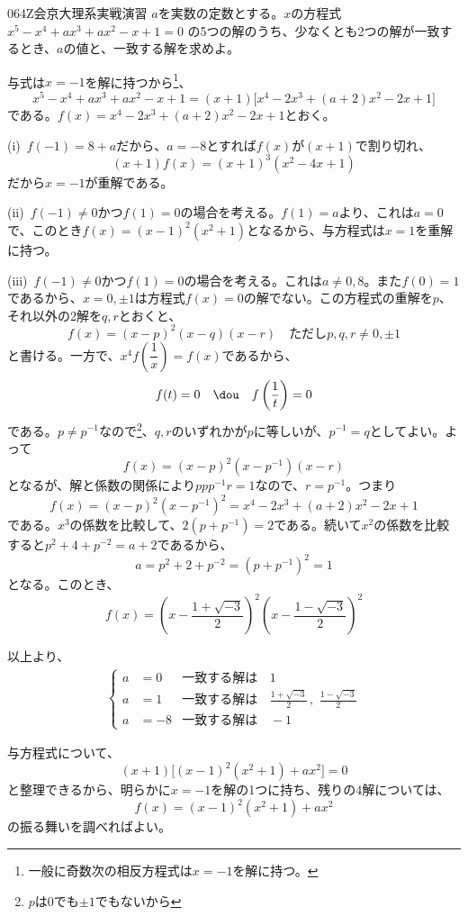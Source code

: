 \begin{prob}{064}{}{Z会京大理系実戦演習}
 $a$を実数の定数とする。$x$の方程式 $x^5-x^4+ax^3+ax^2-x+1=0$ の5つの解のうち、少なくとも2つの解が一致するとき、$a$の値と、一致する解を求めよ。
\end{prob}

与式は$x=-1$を解に持つから\footnote{一般に奇数次の相反方程式は$x=-1$を解に持つ。}、
\[ x^5-x^4+ax^3+ax^2-x+1=(x+1)\bigl[x^4-2x^3+(a+2)x^2-2x+1\bigr] \]
である。$f(x)=x^4-2x^3+(a+2)x^2-2x+1$とおく。

(i)~$f(-1)=8+a$だから、$a=-8$とすれば$f(x)$が$(x+1)$で割り切れ、
\[ (x+1)f(x)=(x+1)^3(x^2-4x+1) \]
だから$x=-1$が重解である。

(ii)~$f(-1)\neq 0$かつ$f(1)=0$の場合を考える。$f(1)=a$より、これは$a=0$で、このとき$f(x)=(x-1)^2(x^2+1)$となるから、与方程式は$x=1$を重解に持つ。

(iii)~$f(-1)\neq 0$かつ$f(1)=0$の場合を考える。これは$a\neq 0, 8$。また$f(0)=1$であるから、$x=0, \pm 1$は方程式$f(x)=0$の解でない。この方程式の重解を$p$、それ以外の2解を$q, r$とおくと、
\[ f(x)=(x-p)^2(x-q)(x-r) \quad \text{ただし$p, q, r\neq 0, \pm 1$} \]
と書ける。一方で、$x^4f\left(\dfrac{1}{x}\right)=f(x)$であるから、
\[ f(t)=0 \quad\dou\quad f\left(\frac{1}{t}\right)=0 \]
である。$p\neq p^{-1}$なので\footnote{$p$は$0$でも$\pm 1$でもないから}、$q, r$のいずれかが$p$に等しいが、$p^{-1}=q$としてよい。よって
\[ f(x)=(x-p)^2(x-p^{-1})(x-r) \]
となるが、解と係数の関係により$ppp^{-1}r=1$なので、$r=p^{-1}$。つまり
\[ f(x)=(x-p)^2(x-p^{-1})^2=x^4-2x^3+(a+2)x^2-2x+1 \]
である。$x^3$の係数を比較して、$2(p+p^{-1})=2$である。続いて$x^2$の係数を比較すると$p^2+4+p^{-2}=a+2$であるから、
\[ a=p^2+2+p^{-2}=(p+p^{-1})^2=1 \]
となる。このとき、
\[ f(x)=\left(x-\frac{1+\sqrt{-3}}{2}\right)^2\left(x-\frac{1-\sqrt{-3}}{2}\right)^2 \]

以上より、
\begin{align*}
 \left\{
 \begin{aligned}
  a&=0 & \text{一致する解は}&\, 1 \\
  a&=1 & \text{一致する解は}&\, \frac{1+\sqrt{-3}}{2}\,,\,\, \frac{1-\sqrt{-3}}{2} \\
  a&=-8 & \text{一致する解は}&\, -1
 \end{aligned}
 \right.
\end{align*}


与方程式について、
\[ (x+1)\bigl[(x-1)^2(x^2+1)+ax^2\bigr]=0 \]
と整理できるから、明らかに$x=-1$を解の1つに持ち、残りの4解については、
\[ f(x)=(x-1)^2(x^2+1)+ax^2 \]
の振る舞いを調べればよい。

